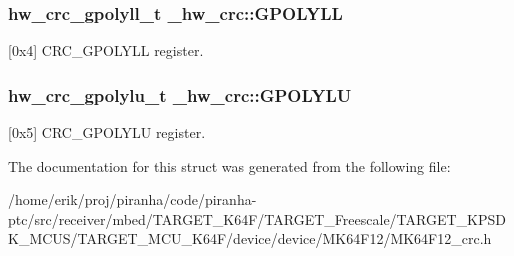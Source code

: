 \subsubsection[{\texorpdfstring{G\+P\+O\+L\+Y\+LL}{GPOLYLL}}]{ {\bf hw\+\_\+crc\+\_\+gpolyll\+\_\+t} \+\_\+hw\+\_\+crc\+::\+G\+P\+O\+L\+Y\+LL}\hypertarget{struct__hw__crc_aea66ee602c6142214b54942bdbde5845}{}\label{struct__hw__crc_aea66ee602c6142214b54942bdbde5845}
\mbox{[}0x4\mbox{]} C\+R\+C\+\_\+\+G\+P\+O\+L\+Y\+LL register. 
\subsubsection[{\texorpdfstring{G\+P\+O\+L\+Y\+LU}{GPOLYLU}}]{ {\bf hw\+\_\+crc\+\_\+gpolylu\+\_\+t} \+\_\+hw\+\_\+crc\+::\+G\+P\+O\+L\+Y\+LU}\hypertarget{struct__hw__crc_ab7ed85b9e3b43ac296f059bbf92d863a}{}\label{struct__hw__crc_ab7ed85b9e3b43ac296f059bbf92d863a}
\mbox{[}0x5\mbox{]} C\+R\+C\+\_\+\+G\+P\+O\+L\+Y\+LU register. 

The documentation for this struct was generated from the following file\+:\begin{DoxyCompactItemize}
\item 
/home/erik/proj/piranha/code/piranha-\/ptc/src/receiver/mbed/\+T\+A\+R\+G\+E\+T\+\_\+\+K64\+F/\+T\+A\+R\+G\+E\+T\+\_\+\+Freescale/\+T\+A\+R\+G\+E\+T\+\_\+\+K\+P\+S\+D\+K\+\_\+\+M\+C\+U\+S/\+T\+A\+R\+G\+E\+T\+\_\+\+M\+C\+U\+\_\+\+K64\+F/device/device/\+M\+K64\+F12/M\+K64\+F12\+\_\+crc.\+h\end{DoxyCompactItemize}
